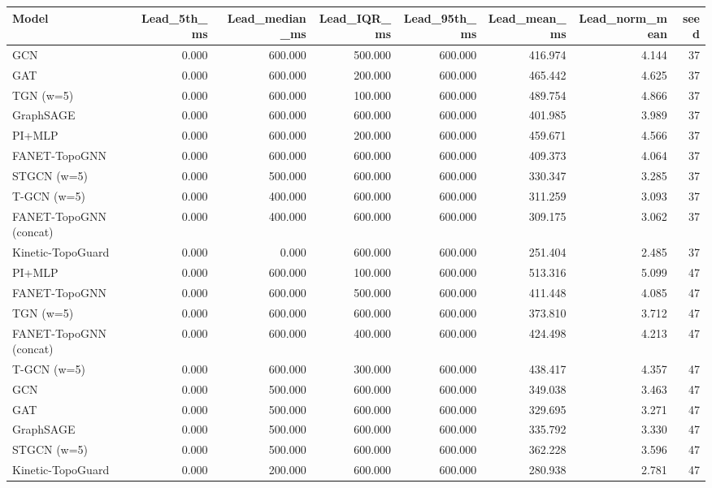 \begin{tabular}{lrrrrrrr}
\toprule
Model & Lead\_5th\_ms & Lead\_median\_ms & Lead\_IQR\_ms & Lead\_95th\_ms & Lead\_mean\_ms & Lead\_norm\_mean & seed \\
\midrule
GCN & 0.000 & 600.000 & 500.000 & 600.000 & 416.974 & 4.144 & 37 \\
GAT & 0.000 & 600.000 & 200.000 & 600.000 & 465.442 & 4.625 & 37 \\
TGN (w=5) & 0.000 & 600.000 & 100.000 & 600.000 & 489.754 & 4.866 & 37 \\
GraphSAGE & 0.000 & 600.000 & 600.000 & 600.000 & 401.985 & 3.989 & 37 \\
PI+MLP & 0.000 & 600.000 & 200.000 & 600.000 & 459.671 & 4.566 & 37 \\
FANET-TopoGNN & 0.000 & 600.000 & 600.000 & 600.000 & 409.373 & 4.064 & 37 \\
STGCN (w=5) & 0.000 & 500.000 & 600.000 & 600.000 & 330.347 & 3.285 & 37 \\
T-GCN (w=5) & 0.000 & 400.000 & 600.000 & 600.000 & 311.259 & 3.093 & 37 \\
FANET-TopoGNN (concat) & 0.000 & 400.000 & 600.000 & 600.000 & 309.175 & 3.062 & 37 \\
Kinetic-TopoGuard & 0.000 & 0.000 & 600.000 & 600.000 & 251.404 & 2.485 & 37 \\
PI+MLP & 0.000 & 600.000 & 100.000 & 600.000 & 513.316 & 5.099 & 47 \\
FANET-TopoGNN & 0.000 & 600.000 & 500.000 & 600.000 & 411.448 & 4.085 & 47 \\
TGN (w=5) & 0.000 & 600.000 & 600.000 & 600.000 & 373.810 & 3.712 & 47 \\
FANET-TopoGNN (concat) & 0.000 & 600.000 & 400.000 & 600.000 & 424.498 & 4.213 & 47 \\
T-GCN (w=5) & 0.000 & 600.000 & 300.000 & 600.000 & 438.417 & 4.357 & 47 \\
GCN & 0.000 & 500.000 & 600.000 & 600.000 & 349.038 & 3.463 & 47 \\
GAT & 0.000 & 500.000 & 600.000 & 600.000 & 329.695 & 3.271 & 47 \\
GraphSAGE & 0.000 & 500.000 & 600.000 & 600.000 & 335.792 & 3.330 & 47 \\
STGCN (w=5) & 0.000 & 500.000 & 600.000 & 600.000 & 362.228 & 3.596 & 47 \\
Kinetic-TopoGuard & 0.000 & 200.000 & 600.000 & 600.000 & 280.938 & 2.781 & 47 \\
\bottomrule
\end{tabular}